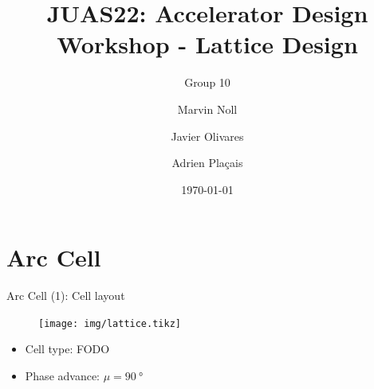 \documentclass{beamer}
\title[Topic III: Lattice Design]{JUAS22: Accelerator Design Workshop - Lattice Design}
\subtitle{Group 10}
\author[Noll, Olivares, Plaçais]{Marvin Noll \and Javier Olivares \and Adrien Plaçais}
\date[\today]{\today}
\begin{document}
\begin{frame}[plain]
  \titlepage
\end{frame}

\section{Arc Cell}
\begin{frame}[t,fragile]{Arc Cell (1): Cell layout}
\begin{figure}
\centering
\texttt{[image: img/lattice.tikz]}
\end{figure}
\begin{itemize}
\item Cell type: FODO
\item Phase advance: $\mu=\SI{90}{\degree}$
\end{itemize}
\end{frame}
\end{document}
